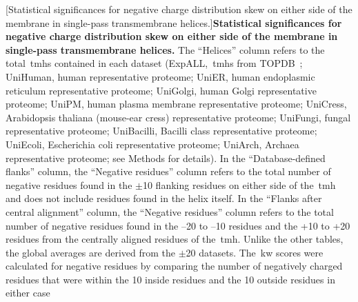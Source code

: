 \begin{table}[htbp!]

    \centering
    [Statistical significances for negative charge distribution skew on either side of the membrane in single-pass transmembrane helices.]{\textbf{Statistical significances for negative charge distribution skew on either side of the membrane in single-pass transmembrane helices.} The “Helices” column refers to the total~\gls{tmh}s contained in each dataset (ExpALL,~\gls{tmh}s from TOPDB~\cite{Dobson2015}; UniHuman, human representative proteome; UniER, human endoplasmic reticulum representative proteome; UniGolgi, human Golgi representative proteome; UniPM, human plasma membrane representative proteome; UniCress, Arabidopsis thaliana (mouse-ear cress) representative proteome; UniFungi, fungal representative proteome; UniBacilli, Bacilli class representative proteome; UniEcoli, Escherichia coli representative proteome; UniArch, Archaea representative proteome; see Methods for details).
In the ``Database-defined flanks'' column, the ``Negative residues'' column refers to the total number of negative residues found in the $\pm$10 flanking residues on either side of the~\gls{tmh} and does not include residues found in the helix itself.
In the ``Flanks after central alignment'' column, the ``Negative residues'' column refers to the total number of negative residues found in the –20 to –10 residues and the +10 to +20 residues from the centrally aligned residues of the~\gls{tmh}.
Unlike the other tables, the global averages are derived from the $\pm$20 datasets.
The~\gls{kw} scores were calculated for negative residues by comparing the number of negatively charged residues that were within the 10 inside residues and the 10 outside residues in either case}
\end{table}
